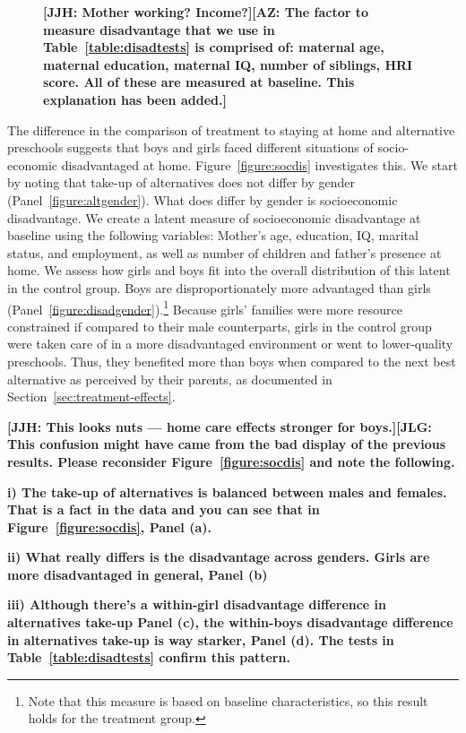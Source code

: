 \begin{figure}
\textbf{[JJH: Mother working? Income?][AZ: The factor to measure disadvantage that we use in Table~\ref{table:disadtests} is comprised of: maternal age, maternal education, maternal IQ, number of siblings, HRI score. All of these are measured at baseline. This explanation has been added.]}
\end{figure}

The difference in the comparison of treatment to staying at home and alternative preschools suggests that boys and girls faced different situations of socio-economic disadvantaged at home. Figure~\ref{figure:socdis} investigates this. We start by noting that take-up of alternatives does not differ by gender (Panel~\ref{figure:altgender}). What does differ by gender is socioeconomic disadvantage. We create a latent measure of socioeconomic disadvantage at baseline using the following variables: Mother's age, education, IQ, marital status, and employment, as well as number of children and father's presence at home. We assess how girls and boys fit into the overall distribution of this latent in the control group. Boys are disproportionately more advantaged than girls (Panel~\ref{figure:disadgender}).\footnote{Note that this measure is based on baseline characteristics, so this result holds for the treatment group.} Because girls' families were more resource constrained if compared to their male counterparts, girls in the control group were taken care of in a more disadvantaged environment or went to lower-quality preschools. Thus, they benefited more than boys when compared to the next best alternative as perceived by their parents, as documented in Section~\ref{sec:treatment-effects}.

 \textbf{[JJH: This looks nuts --- home care effects stronger for boys.][JLG: This confusion might have came from the bad display of the previous results. Please reconsider Figure~\ref{figure:socdis} and note the following.}

 \textbf{i) The take-up of alternatives is balanced between males and females. That is a fact in the data and you can see that in Figure~\ref{figure:socdis}, Panel (a).}

 \textbf{ii) What really differs is the disadvantage across genders. Girls are more disadvantaged in general, Panel (b)}

 \textbf{iii) Although there's a within-girl disadvantage difference in alternatives take-up Panel (c), the within-boys disadvantage difference in alternatives take-up is way starker, Panel (d). The tests in Table~\ref{table:disadtests} confirm this pattern.}


